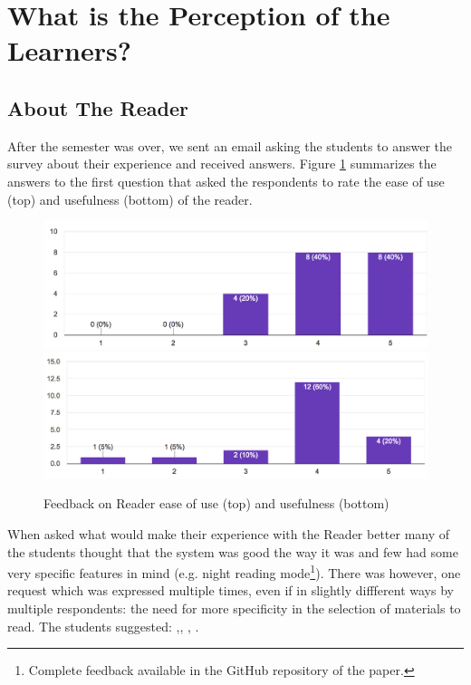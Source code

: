 
\newpage
\section{What is the Perception of the Learners?}
\label{sec:perception}

\subsection{About The Reader}

After the semester was over, we sent an email asking the students to answer the survey about their experience and received \surveyrespondents answers. Figure \ref{fig:reader_use} summarizes the answers to the first question that asked the respondents to rate the ease of use (top) and usefulness (bottom) of the reader. 

 \begin{figure}[h!]
    \centering
      \includegraphics[width=0.8\columnwidth]{figures/opinions/reader_ease_of_use}
      \includegraphics[width=0.8\columnwidth]{figures/opinions/reader_usefulness}
      \caption{Feedback on Reader ease of use (top) and usefulness (bottom)}
      \label{fig:reader_use}
    \end{figure}

When asked what would make their experience with the Reader better many of the students thought that the system was good the way it was and few had some very specific features in mind (e.g. night reading mode\footnote{Complete feedback available in the GitHub repository of the paper.}). There was however, one request which was expressed multiple times, even if in slightly diffferent ways by multiple respondents: the need for more specificity in the selection of materials to read. The students suggested: ,, , . 

